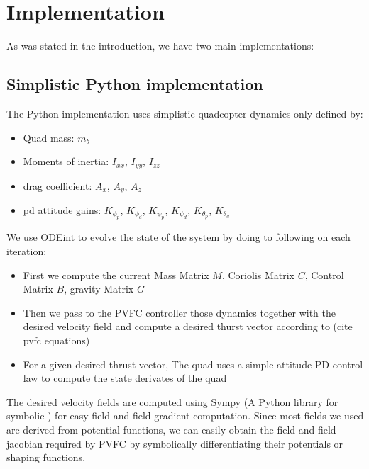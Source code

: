 \section{Implementation}
\label{Implementation section}
As was stated in the introduction, we have two main implementations: 
\subsection*{Simplistic Python implementation}
The Python implementation uses simplistic quadcopter dynamics only defined by:
\begin{itemize}
    \item Quad mass: $m_b$
    \item Moments of inertia: $I_{xx}$, $I_{yy}$, $I_{zz}$
    \item drag coefficient: $A_{x}$, $A_{y}$, $A_{z}$
    \item pd attitude gains: $K_{\phi_{p}}$, $K_{\phi_{d}}$, $K_{\psi_{p}}$, $K_{\psi_{d}}$, $K_{\theta_{p}}$, $K_{\theta_{d}}$
\end{itemize}

We use ODEint to evolve the state of the system by doing to following on each iteration: 
\begin{itemize}
    \item First we compute the current Mass Matrix $M$, Coriolis Matrix $C$, Control Matrix $B$, gravity Matrix $G$
    \item Then we pass to the PVFC controller those dynamics together with the desired velocity field and compute a desired thurst vector according to (cite pvfc equations)
    \item For a given desired thrust vector, The quad uses a simple attitude PD control law to compute the state derivates of the quad
\end{itemize}


The desired velocity fields are computed using Sympy (A Python library for symbolic ) for easy field and field gradient computation. Since most fields we used are derived from potential functions, we can easily obtain the field and field jacobian required by PVFC by symbolically differentiating their potentials or shaping functions.

